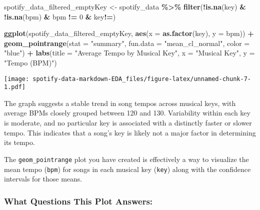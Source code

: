 \documentclass[
]{article}
\newenvironment{Shaded}{\begin{snugshade}}{\end{snugshade}}
\newcommand{\AttributeTok}[1]{\textcolor[rgb]{0.13,0.29,0.53}{#1}}
\newcommand{\DecValTok}[1]{\textcolor[rgb]{0.00,0.00,0.81}{#1}}
\newcommand{\FunctionTok}[1]{\textcolor[rgb]{0.13,0.29,0.53}{\textbf{#1}}}
\newcommand{\NormalTok}[1]{#1}
\newcommand{\OtherTok}[1]{\textcolor[rgb]{0.56,0.35,0.01}{#1}}
\newcommand{\SpecialCharTok}[1]{\textcolor[rgb]{0.81,0.36,0.00}{\textbf{#1}}}
\newcommand{\StringTok}[1]{\textcolor[rgb]{0.31,0.60,0.02}{#1}}
\begin{document}
\begin{Shaded}
\begin{Highlighting}[]
\NormalTok{spotify\_data\_filtered\_emptyKey }\OtherTok{\textless{}{-}}\NormalTok{ spotify\_data }\SpecialCharTok{\%\textgreater{}\%}
  \FunctionTok{filter}\NormalTok{(}\SpecialCharTok{!}\FunctionTok{is.na}\NormalTok{(key) }\SpecialCharTok{\&} \SpecialCharTok{!}\FunctionTok{is.na}\NormalTok{(bpm) }\SpecialCharTok{\&}\NormalTok{ bpm }\SpecialCharTok{!=} \DecValTok{0} \SpecialCharTok{\&}\NormalTok{ key}\SpecialCharTok{!=}\StringTok{\textquotesingle{}\textquotesingle{}}\NormalTok{)}

\FunctionTok{ggplot}\NormalTok{(spotify\_data\_filtered\_emptyKey, }\FunctionTok{aes}\NormalTok{(}\AttributeTok{x =} \FunctionTok{as.factor}\NormalTok{(key), }\AttributeTok{y =}\NormalTok{ bpm)) }\SpecialCharTok{+}
  \FunctionTok{geom\_pointrange}\NormalTok{(}\AttributeTok{stat =} \StringTok{"summary"}\NormalTok{, }\AttributeTok{fun.data =} \StringTok{"mean\_cl\_normal"}\NormalTok{, }\AttributeTok{color =} \StringTok{"blue"}\NormalTok{) }\SpecialCharTok{+}
  \FunctionTok{labs}\NormalTok{(}\AttributeTok{title =} \StringTok{"Average Tempo by Musical Key"}\NormalTok{,}
       \AttributeTok{x =} \StringTok{"Musical Key"}\NormalTok{,}
       \AttributeTok{y =} \StringTok{"Tempo (BPM)"}\NormalTok{)}
\end{Highlighting}
\end{Shaded}

\texttt{[image: spotify-data-markdown-EDA\_files/figure-latex/unnamed-chunk-7-1.pdf]}

The graph suggests a stable trend in song tempos across musical keys,
with average BPMs closely grouped between 120 and 130. Variability
within each key is moderate, and no particular key is associated with a
distinctly faster or slower tempo. This indicates that a song's key is
likely not a major factor in determining its tempo.

The \texttt{geom\_pointrange} plot you have created is effectively a way
to visualize the mean tempo (\texttt{bpm}) for songs in each musical key
(\texttt{key}) along with the confidence intervals for those means.

\hypertarget{what-questions-this-plot-answers}{%
\subsubsection{What Questions This Plot
Answers:}\label{what-questions-this-plot-answers}}
\end{document}
